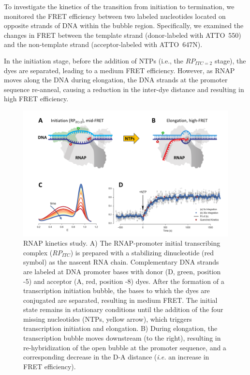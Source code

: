 To investigate the kinetics of the transition from initiation to termination, we monitored the FRET efficiency between two labeled nucleotides located on opposite strands of DNA within the bubble region. 
Specifically, we examined the changes in FRET between the template strand (donor-labeled with ATTO~550) and the non-template strand (acceptor-labeled with ATTO~647N).

In the initiation stage, before the addition of \ac{NTP}s (i.e., the $RP_{ITC=2}$ stage), the dyes are separated, leading to a medium FRET efficiency. 
However, as \ac{RNAP} moves along the DNA during elongation, the DNA strands at the promoter sequence re-anneal, causing a reduction in the inter-dye distance and resulting in high FRET efficiency.

\begin{figure}
\centering\includegraphics[width=\textwidth]{chapters/figures/RNAP_kinetics.png}
\caption{\label{fig:RNAP_kinetics} 
RNAP kinetics study.
A) The RNAP-promoter initial transcribing complex ($RP_{ITC}$) is prepared with a stabilizing dinucleotide (red symbol) as the nascent RNA chain.
Complementary DNA strands are labeled at DNA promoter bases with donor (D, green, position -5) and acceptor (A, red, position -8) dyes. 
After the formation of a transcription initiation bubble, the bases to which the dyes are conjugated
are separated, resulting in medium FRET. 
The initial state remains in stationary conditions until the addition of the four missing nucleotides (\ac{NTP}s, yellow arrow), which triggers transcription initiation and elongation. 
B) During elongation, the transcription bubble moves downstream (to the right), resulting in re-hybridization of the open bubble at the promoter sequence, and a corresponding decrease in the D-A distance (\textit{i.e.} an increase in FRET efficiency).
}
\end{figure}
